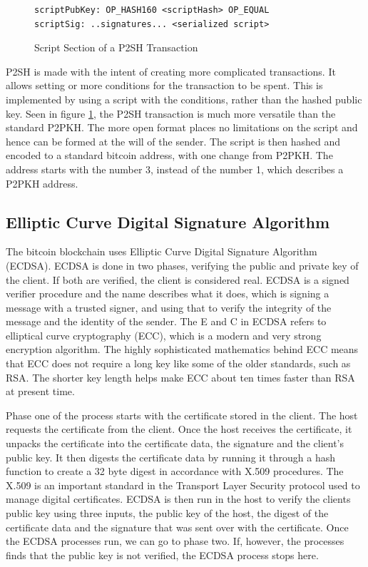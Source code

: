 \documentclass[12pt]{article}
\begin{document}
\begin{figure}[h!]
\begin{lstlisting}[numbers=none]
scriptPubKey: OP_HASH160 <scriptHash> OP_EQUAL 
scriptSig: ..signatures... <serialized script>
 \end{lstlisting}
 \caption{Script Section of a P2SH Transaction}
 \label{fig:transaction2}
\end{figure}

P2SH is made with the intent of creating more complicated transactions. It allows setting or more conditions for the transaction to be spent. This is implemented by using a script with the conditions, rather than the hashed public key. Seen in figure \ref{fig:transaction2}, the P2SH transaction is much more versatile than the standard P2PKH. The more open format places no limitations on the script and hence can be formed at the will of the sender. The script is then hashed and encoded to a standard bitcoin address, with one change from P2PKH. The address starts with the number 3, instead of the number 1, which describes a P2PKH address. 

\subsection{Elliptic Curve Digital Signature Algorithm}
The bitcoin blockchain uses Elliptic Curve Digital Signature Algorithm (ECDSA). ECDSA is done in two phases, verifying the public and private key of the client. If both are verified, the client is considered real. ECDSA is a signed verifier procedure and the name describes what it does, which is signing a message with a trusted signer, and using that to verify the integrity of the message and the identity of the sender. The E and C in ECDSA refers to elliptical curve cryptography (ECC), which is a modern and very strong encryption algorithm. The highly sophisticated mathematics behind ECC means that ECC does not require a long key like some of the older standards, such as RSA. The shorter key length helps make ECC about ten times faster than RSA\cite{jansma2004performance} at present time. 

Phase one of the process starts with the certificate stored in the client. The host requests the certificate from the client. Once the host receives the certificate, it unpacks the certificate into the certificate data, the signature and the client's public key. It then digests the certificate data by running it through a hash function to create a 32 byte digest in accordance with X.509 procedures. The X.509 is an important standard in the Transport Layer Security protocol used to manage digital certificates. ECDSA is then run in the host to verify the clients public key using three inputs, the public key of the host, the digest of the certificate data and the signature that was sent over with the certificate. Once the ECDSA processes run, we can go to phase two. If, however, the processes finds that the public key is not verified, the ECDSA process stops here.
\end{document}
